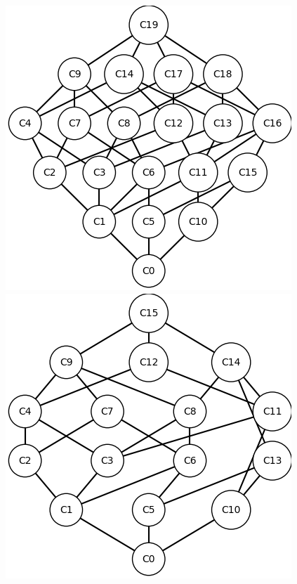 \documentclass[runningheads,a4paper]{llncs}
\begin{document}
\begin{example}
\begin{figure}
	\centering
	\begin{minipage}{0.3\textwidth}
		\centering
		\includegraphics[width = \textwidth]{im/ex-ma2-R1+R2 (top).png}
	\end{minipage}
	\begin{minipage}{0.3\textwidth}
		\centering
		\includegraphics[width = \textwidth]{im/ex-ma2-R1+R2 (other).png}

\end{minipage}
\end{figure}
\end{example}
\end{document}

